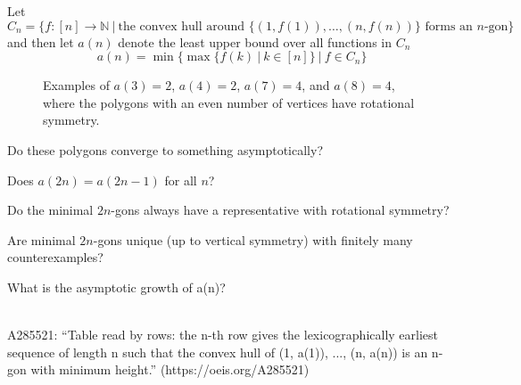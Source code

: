 \documentclass{article}
\begin{document}
  Let \[
    C_n = \{f: [n] \rightarrow \mathbb{N}\ |\ \text{the convex hull around } \{(1, f(1)), \hdots, (n, f(n))\} \text{ forms an } n\text{-gon}\}
  \] and then let $a(n)$ denote the least upper bound over all functions in $C_n$ \[
    a(n) = \min\{\max\{f(k)\ |\ k \in [n]\}\ |\ f \in C_n\}
  \]
\begin{figure}[!h]
  \centering
  \caption{Examples of $a(3) = 2$, $a(4) = 2$, $a(7) = 4$, and $a(8) = 4$, where
    the polygons with an even number of vertices have rotational symmetry.}
\end{figure}

\begin{question}
  Do these polygons converge to something asymptotically?
\end{question}

\begin{related}
  \item Does $a(2n) = a(2n - 1)$ for all $n$?
  \item Do the minimal $2n$-gons always have a representative with rotational
    symmetry?
  \item Are minimal $2n$-gons unique (up to vertical symmetry) with finitely
    many counterexamples?
  \item What is the asymptotic growth of a(n)?
\end{related}

\begin{references} \text{} \\
  A285521: ``Table read by rows: the n-th row gives the lexicographically earliest sequence of length n such that the convex hull of (1, a(1)), ..., (n, a(n)) is an n-gon with minimum height.'' (https://oeis.org/A285521)
\end{references}
\end{document}
